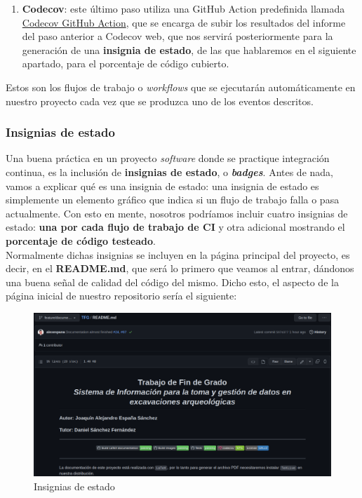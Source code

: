\begin{enumerate}
\begin{enumerate}
\begin{enumerate}
                        \item \textbf{Codecov}: este último paso utiliza una GitHub Action
                        predefinida llamada
                        \href{https://github.com/marketplace/actions/codecov}{Codecov GitHub
                        Action}, que se encarga de subir los resultados del informe del paso
                        anterior a Codecov web, que nos servirá posteriormente para la
                        generación de una \textbf{insignia de estado}, de las que hablaremos
                        en el siguiente apartado, para el porcentaje de código cubierto.
                    \end{enumerate}
            \end{enumerate}
    \end{enumerate}

\newpage Estos son los flujos de trabajo o \textit{workflows} que se ejecutarán automáticamente en
nuestro proyecto cada vez que se produzca uno de los eventos descritos.

\subsubsection{Insignias de estado}
Una buena práctica en un proyecto \textit{software} donde se practique integración continua,
es la inclusión de \textbf{insignias de estado}, o \textbf{\textit{badges}}. Antes de nada,
vamos a explicar qué es una insignia de estado: una insignia de estado es simplemente un
elemento gráfico que indica si un flujo de trabajo falla o pasa actualmente. Con esto en
mente, nosotros podríamos incluir cuatro insignias de estado: \textbf{una por cada flujo de
trabajo de CI} y otra adicional mostrando el \textbf{porcentaje de código testeado}.\\

Normalmente dichas insignias se incluyen en la página principal del proyecto, es decir, en
el \textbf{README.md}, que será lo primero que veamos al entrar, dándonos una buena señal
de calidad del código del mismo. Dicho esto, el aspecto de la página inicial de nuestro
repositorio sería el siguiente:

    \begin{figure}[H]
        \centering
        \includegraphics[scale=0.27]{imagenes/badge-status.png}
        \caption{Insignias de estado}
        \label{fig:badge-status}
    \end{figure}

